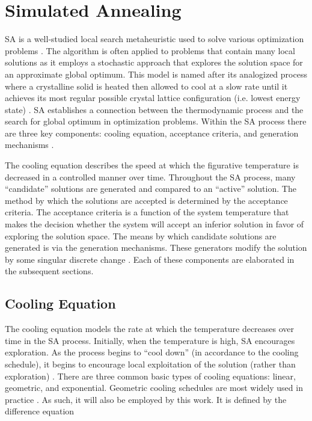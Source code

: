 \documentclass[energies,article,submit,moreauthors]{Definitions/mdpi}
\begin{document}
\section{Simulated Annealing}
\label{sec:sa-simulated-annealing}
SA is a well-studied local search metaheuristic used to solve various optimization problems
\cite{gendreau-2018-handb-metah,press-1992-numer-recip}. The algorithm is often applied to problems that contain many
local solutions as it employs a stochastic approach that explores the solution space for an approximate global optimum.
This model is named after its analogized process where a crystalline solid is heated then allowed to cool at a slow rate
until it achieves its most regular possible crystal lattice configuration (i.e. lowest energy state)
\cite{henderson-1989-theor-pract,press-1992-numer-recip}. SA establishes a connection between the thermodynamic
process and the search for global optimum in optimization problems. Within the SA process there are three key
components: cooling equation, acceptance criteria, and generation mechanisms
\cite{keller-2019-multi-objec,press-1992-numer-recip}.

The cooling equation describes the speed at which the figurative temperature is decreased in a controlled manner over
time. Throughout the SA process, many ``candidate'' solutions are generated and compared to an ``active'' solution. The
method by which the solutions are accepted is determined by the acceptance criteria. The acceptance criteria is a
function of the system temperature that makes the decision whether the system will accept an inferior solution in favor
of exploring the solution space. The means by which candidate solutions are generated is via the generation mechanisms.
These generators modify the solution by some singular discrete change \cite{gendreau-2018-handb-metah}. Each of these
components are elaborated in the subsequent sections.

\subsection{Cooling Equation}
\label{cooling-equation-experimental}
The cooling equation models the rate at which the temperature decreases over time in the SA process. Initially, when the
temperature is high, SA encourages exploration. As the process begins to ``cool down'' (in accordance to the cooling
schedule), it begins to encourage local exploitation of the solution (rather than exploration)
\cite{rutenbar-1989-simul-anneal-algor,henderson-1989-theor-pract}. There are three common basic types of cooling
equations: linear, geometric, and exponential. Geometric cooling schedules are most widely used in practice
\cite{keller-2019-multi-objec}. As such, it will also be employed by this work. It is defined by the difference
equation
\end{document}
